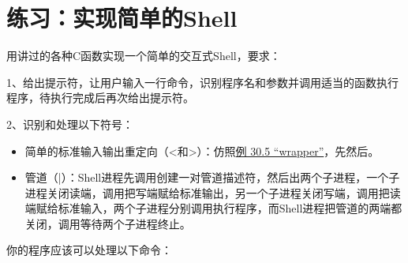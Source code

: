 


\section{练习：实现简单的Shell}
%
用讲过的各种C函数实现一个简单的交互式Shell，要求：



1、给出提示符，让用户输入一行命令，识别程序名和参数并调用适当的函数执行程序，待执行完成后再次给出提示符。



2、识别和处理以下符号：


\begin{itemize}

\item 简单的标准输入输出重定向（\textless{}和\textgreater{}）：仿照\hyperlink{db.ch30s03.id2867183}{例 30.\BookSplit{}5 “wrapper”}，先然后。

\item 管道（|）：Shell进程先调用创建一对管道描述符，然后出两个子进程，一个子进程关闭读端，调用把写端赋给标准输出，另一个子进程关闭写端，调用把读端赋给标准输入，两个子进程分别调用执行程序，而Shell进程把管道的两端都关闭，调用等待两个子进程终止。
\end{itemize}


你的程序应该可以处理以下命令：


\begin{BookLiteral}
\end{BookLiteral}

